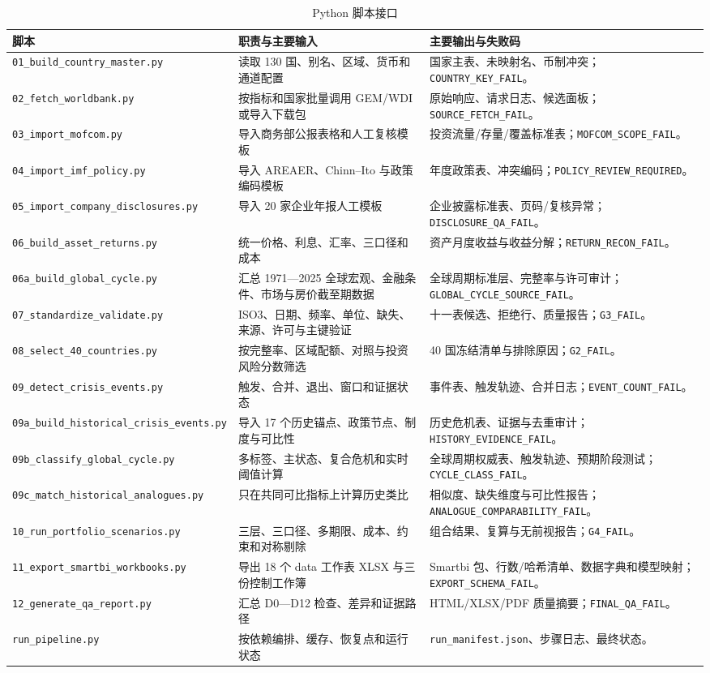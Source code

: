 \documentclass[UTF8,fontset=windows,12pt,openany]{ctexbook}
\newcommand{\Field}[1]{{\small\nolinkurl{#1}}}
\newcommand{\File}[1]{{\small\nolinkurl{#1}}}
\begin{document}
\begin{longtable}{p{4.3cm}p{4.5cm}p{4.6cm}}
\caption{Python 脚本接口}\label{tab:scripts}\\
\toprule
\textbf{脚本} & \textbf{职责与主要输入} & \textbf{主要输出与失败码}\\
\midrule
\File{01_build_country_master.py} & 读取 130 国、别名、区域、货币和通道配置 & 国家主表、未映射名、币制冲突；\Field{COUNTRY_KEY_FAIL}。\\
\File{02_fetch_worldbank.py} & 按指标和国家批量调用 GEM/WDI 或导入下载包 & 原始响应、请求日志、候选面板；\Field{SOURCE_FETCH_FAIL}。\\
\File{03_import_mofcom.py} & 导入商务部公报表格和人工复核模板 & 投资流量/存量/覆盖标准表；\Field{MOFCOM_SCOPE_FAIL}。\\
\File{04_import_imf_policy.py} & 导入 AREAER、Chinn--Ito 与政策编码模板 & 年度政策表、冲突编码；\Field{POLICY_REVIEW_REQUIRED}。\\
\File{05_import_company_disclosures.py} & 导入 20 家企业年报人工模板 & 企业披露标准表、页码/复核异常；\Field{DISCLOSURE_QA_FAIL}。\\
\File{06_build_asset_returns.py} & 统一价格、利息、汇率、三口径和成本 & 资产月度收益与收益分解；\Field{RETURN_RECON_FAIL}。\\
\File{06a_build_global_cycle.py} & 汇总 1971—2025 全球宏观、金融条件、市场与房价截至期数据 & 全球周期标准层、完整率与许可审计；\Field{GLOBAL_CYCLE_SOURCE_FAIL}。\\
\File{07_standardize_validate.py} & ISO3、日期、频率、单位、缺失、来源、许可与主键验证 & 十一表候选、拒绝行、质量报告；\Field{G3_FAIL}。\\
\File{08_select_40_countries.py} & 按完整率、区域配额、对照与投资风险分数筛选 & 40 国冻结清单与排除原因；\Field{G2_FAIL}。\\
\File{09_detect_crisis_events.py} & 触发、合并、退出、窗口和证据状态 & 事件表、触发轨迹、合并日志；\Field{EVENT_COUNT_FAIL}。\\
\File{09a_build_historical_crisis_events.py} & 导入 17 个历史锚点、政策节点、制度与可比性 & 历史危机表、证据与去重审计；\Field{HISTORY_EVIDENCE_FAIL}。\\
\File{09b_classify_global_cycle.py} & 多标签、主状态、复合危机和实时阈值计算 & 全球周期权威表、触发轨迹、预期阶段测试；\Field{CYCLE_CLASS_FAIL}。\\
\File{09c_match_historical_analogues.py} & 只在共同可比指标上计算历史类比 & 相似度、缺失维度与可比性报告；\Field{ANALOGUE_COMPARABILITY_FAIL}。\\
\File{10_run_portfolio_scenarios.py} & 三层、三口径、多期限、成本、约束和对称剔除 & 组合结果、复算与无前视报告；\Field{G4_FAIL}。\\
\File{11_export_smartbi_workbooks.py} & 导出 18 个 data 工作表 XLSX 与三份控制工作簿 & Smartbi 包、行数/哈希清单、数据字典和模型映射；\Field{EXPORT_SCHEMA_FAIL}。\\
\File{12_generate_qa_report.py} & 汇总 D0—D12 检查、差异和证据路径 & HTML/XLSX/PDF 质量摘要；\Field{FINAL_QA_FAIL}。\\
\File{run_pipeline.py} & 按依赖编排、缓存、恢复点和运行状态 & \File{run_manifest.json}、步骤日志、最终状态。\\
\bottomrule
\end{longtable}
\end{document}
